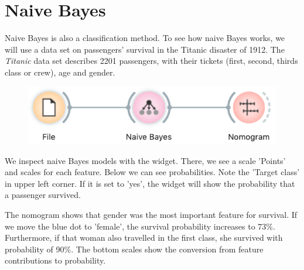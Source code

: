 \chapter{Naive Bayes}
\label{ch:naive_bayes}

Naive Bayes  is also a classification method. To see how naive Bayes works, we will use a data set on passengers' survival in the Titanic disaster of 1912. The \textit{Titanic} data set describes 2201 passengers, with their tickets (first, second, thirds class or crew), age and gender.

\begin{figure}[h]
    \centering
    \vspace{-0.2cm}
    \includegraphics[scale=0.4]{workflow.png}
\end{figure}

We inspect naive Bayes models with the  widget. There, we see a scale 'Points' and scales for each feature. Below we can see probabilities. Note the 'Target class' in upper left corner. If it is set to 'yes', the widget will show the probability that a passenger survived.

The nomogram shows that gender was the most important feature for survival. If we move the blue dot to 'female', the survival probability increases to 73\%. Furthermore, if that woman also travelled in the first class, she survived with probability of 90\%. The bottom scales show the conversion from feature contributions to probability.

